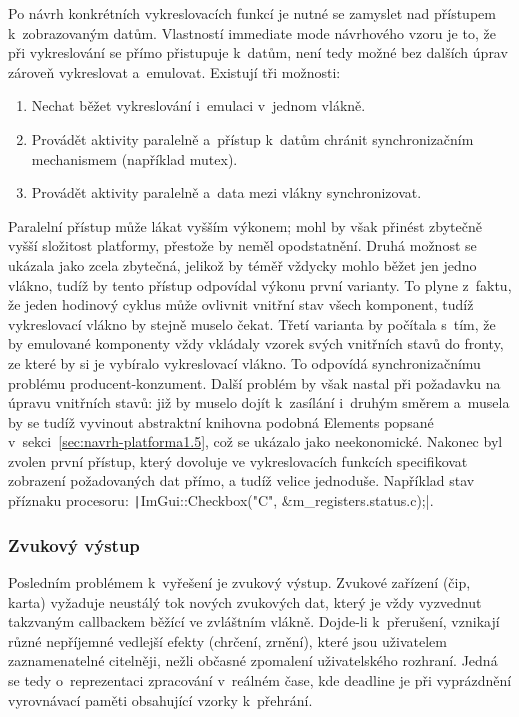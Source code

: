 Po návrh konkrétních vykreslovacích funkcí je nutné se zamyslet nad přístupem k~zobrazovaným datům. Vlastností immediate mode návrhového vzoru je to, že při vykreslování se přímo přistupuje k~datům, není tedy možné bez dalších úprav zároveň vykreslovat a~emulovat. Existují tři možnosti:
\begin{enumerate}
	\item Nechat běžet vykreslování i~emulaci v~jednom vlákně.
	\item Provádět aktivity paralelně a~přístup k~datům chránit synchronizačním mechanismem (například mutex).
	\item Provádět aktivity paralelně a~data mezi vlákny synchronizovat.
\end{enumerate}

Paralelní přístup může lákat vyšším výkonem; mohl by však přinést zbytečně vyšší složitost platformy, přestože by neměl opodstatnění. Druhá možnost se ukázala jako zcela zbytečná, jelikož by téměř vždycky mohlo běžet jen jedno vlákno, tudíž by tento přístup odpovídal výkonu první varianty. To plyne z~faktu, že jeden hodinový cyklus může ovlivnit vnitřní stav všech komponent, tudíž vykreslovací vlákno by stejně muselo čekat. Třetí varianta by počítala s~tím, že by emulované komponenty vždy vkládaly vzorek svých vnitřních stavů do fronty, ze které by si je vybíralo vykreslovací vlákno. To odpovídá synchronizačnímu problému producent-konzument. Další problém by však nastal při požadavku na úpravu vnitřních stavů: již by muselo dojít k~zasílání i~druhým směrem a~musela by se tudíž vyvinout abstraktní knihovna podobná Elements popsané v~sekci~\ref{sec:navrh-platforma1.5}, což se ukázalo jako neekonomické. Nakonec byl zvolen první přístup, který dovoluje ve vykreslovacích funkcích specifikovat zobrazení požadovaných dat přímo, a tudíž velice jednoduše. Například stav příznaku procesoru: \texttt|ImGui::Checkbox("C", &m_registers.status.c);|.

\subsubsection{Zvukový výstup}
Posledním problémem k~vyřešení je zvukový výstup. Zvukové zařízení (čip, karta) vyžaduje neustálý tok nových zvukových dat, který je vždy vyzvednut takzvaným callbackem běžící ve zvláštním vlákně. Dojde-li k~přerušení, vznikají různé nepříjemné vedlejší efekty (chrčení, zrnění), které jsou uživatelem zaznamenatelné citelněji, nežli občasné zpomalení uživatelského rozhraní. Jedná se tedy o~reprezentaci zpracování v~reálném čase, kde deadline je při vyprázdnění vyrovnávací paměti obsahující vzorky k~přehrání.

